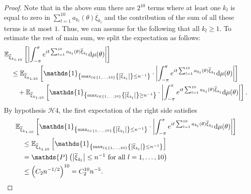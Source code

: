\documentclass[12pt]{amsart}
\theoremstyle{plain}
\numberwithin{equation}{section}
\renewcommand{\Pr}{\mathbb{P}}
\newcommand{\<}{\langle}
\renewcommand{\>}{\rangle}
\newcommand{\PP}[1]{\left(#1\right)}
\newcommand{\LL}[1]{\left\{#1\right\}}
\newcommand{\dd}{\textnormal{d}}
\newcommand{\E}[2][ ]{\mathbb{E}{#1}\left[#2\right]}
\newcommand{\abs}[1]{\left|#1\right|}
\renewcommand{\Pr}[1]{\mathds{P}\left(#1\right)}
\begin{document}
\begin{proof}
Note that in the above sum there are $2^{10}$ terms where at least one $k_l$ is equal to zero in $\sum_{l=1}^{10} a_{k_l}(\theta) \overline{\xi}_{k_l} $ and the contribution of the sum of all these terms is at most $1$. Thus, we can assume for the following that all $k_l\geq 1$. To estimate the rest of main sum, we split the expectation as follows:
\begin{align*}
& \E[_{\overline{\xi}_{k_{1:10}} }]{\abs{\int_{-\pi}^{\pi} e^{it\sum_{l=1}^{10} a_{k_l}(\theta) \overline{\xi}_{k_l} } \dd \mu(\theta)}} \\
& \quad \leq \E[_{\overline{\xi}_{k_{1:10}} }]{\mathds{1}_{\LL{\max_{l\in\LL{1,\ldots,10}}\LL{\abs{\overline{\xi}_{k_l}}} \leq n^{-1}}}\cdot \abs{ \int_{-\pi}^{\pi} e^{it\sum_{l=1}^{10} a_{k_l}(\theta) \overline{\xi}_{k_l} } \dd \mu(\theta) } } \\ 
& \quad\quad + \E[_{\overline{\xi}_{k_{1:10}} }]{\mathds{1}_{\LL{\max_{l\in\LL{1,\ldots,10}}\LL{\abs{\overline{\xi}_{k_l}}} \geq n^{-1}} } \cdot \abs{ \int_{-\pi}^{\pi} e^{it\sum_{l=1}^{10} a_{k_l}(\theta) \overline{\xi}_{k_l} } \dd \mu(\theta) } }.
\end{align*} 
By hypothesis $\mathcal{H}4$, the first expectation of the right side satisfies 
\begin{align*}
& {\E[_{\overline{\xi}_{k_{1:10}} }]{\mathds{1}_{\LL{{\max_{l\in\LL{1,\ldots,10}}\LL{\abs{\overline{\xi}_{k_l}}} \leq n^{-1}}}} \cdot \abs{ \int_{-\pi}^{\pi} e^{it\sum_{l=1}^{10} a_{k_l}(\theta) \overline{\xi}_{k_l} } \dd \mu(\theta) } }} \\
& \quad \leq \E[_{\overline{\xi}_{k_{1:10}} }]{\mathds{1}_{\LL{\max_{l\in\LL{1,\ldots,10}}\LL{\abs{\overline{\xi}_{k_l}}} \leq n^{-1}} }}\\
& \quad = \Pr{\abs{\overline{\xi}_{k_l}} \leq n^{-1} \mbox{ for all $l=1,\ldots,10$}} \\
& \quad \leq \PP{C_2n^{-1/2}}^{10} = C_2^{10}n^{-5}.
\end{align*}


\end{proof}
\end{document}
